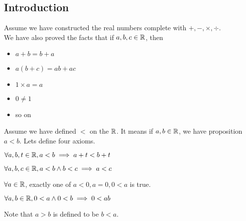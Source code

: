 \documentclass[a4paper]{article}
\begin{document}
\subsection{Introduction}
Assume we have constructed the real numbers complete with $+, -, \times, \div$.\\
We have also proved the facts that if $a,b,c \in \mathbb{R}$, then
\begin{itemize}
	\item $a + b = b + a$
	\item $a(b+c) = ab + ac$
	\item $1 \times a = a$
	\item $0 \neq 1$
	\item so on
\end{itemize}
Assume we have defined $<$ on the $\mathbb{R}$. It means if $a,b \in \mathbb{R}$, we have proposition $a < b$. Lets define four axioms.
\begin{axiom}[A1]\label{A1}
$\forall a, b, t \in \mathbb{R}, a < b \implies a + t < b + t$
\end{axiom}
\begin{axiom}[A2]\label{A2}
$\forall a, b, c \in \mathbb{R}, a < b \land b < c \implies a < c$
\end{axiom}
\begin{axiom}[A3]\label{A3}
$\forall a \in \mathbb{R}$, exactly one of $a<0, a=0, 0<a$ is true.
\end{axiom}
\begin{axiom}[A4]\label{A4}
$\forall a, b \in \mathbb{R}, 0 < a \land 0 < b \implies 0 < ab$
\end{axiom}
\begin{notation}
Note that $a > b$ is defined to be $b < a$.
\end{notation}
\end{document}
